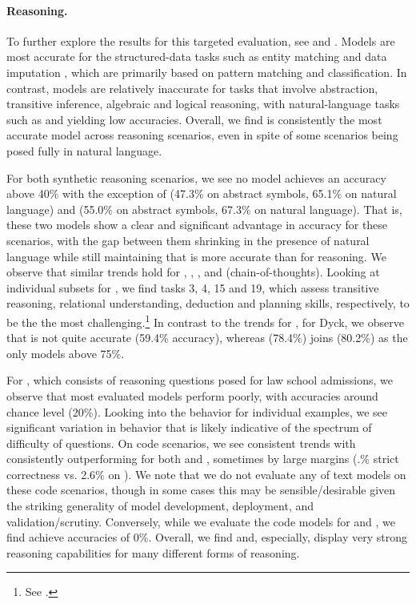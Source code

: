 \paragraph{Reasoning.}
To further explore the results for this targeted evaluation, see  and .
Models are most accurate for the structured-data tasks such as entity matching and data imputation \citep{narayan2022can}, which are primarily based on pattern matching and classification.
In contrast, models are relatively inaccurate for tasks that involve abstraction, transitive inference, algebraic and logical reasoning, with natural-language tasks such as \lsat \citep{zhong2021arlsat} and \gsm \citep{cobbe2020leveraging} yielding low accuracies.
Overall, we find \davincicodex is consistently the most accurate model across reasoning scenarios, even in spite of some scenarios being posed fully in natural language. 

For both synthetic reasoning scenarios, we see no model achieves an accuracy above 40\% with the exception of \instructdavinci (47.3\% on abstract symbols, 65.1\% on natural language) and \davincicodex (55.0\% on abstract symbols, 67.3\% on natural language). 
That is, these two models show a clear and significant advantage in accuracy for these scenarios, with the gap between them shrinking in the presence of natural language while still maintaining that \davincicodex is more accurate than \instructdavinci for reasoning. 
We observe that similar trends hold for \MATH, \gsm, \babi, and \MATH (chain-of-thoughts). 
Looking at individual subsets for \babi, we find tasks 3, 4, 15 and 19, which assess transitive reasoning, relational understanding, deduction and planning skills, respectively, to be the the most challenging.\footnote{See .}
In contrast to the trends for \instructdavinci, for Dyck, we observe that \instructdavinci is not quite accurate (59.4\% accuracy), whereas \mtnlgfivethreezero (78.4\%) joins \davincicodex (80.2\%) as the only models above 75\%. 

For \lsat \citep{zhong2021arlsat}, which consists of reasoning questions posed for law school admissions, we observe that most evaluated models perform poorly, with accuracies around chance level (20\%). 
Looking into the behavior for individual examples, we see significant variation in behavior that is likely indicative of the spectrum of difficulty of questions.
On code scenarios, we see consistent trends with \davincicodex consistently outperforming \cushmancodex for both \humaneval and \codeapps, sometimes by large margins (.\% strict correctness vs. 2.6\% on \codeapps). 
We note that we do not evaluate any of text models on these code scenarios, though in some cases this may be sensible/desirable given the striking generality of model development, deployment, and validation/scrutiny. 
Conversely, while we evaluate the code models for \lsat and \legalsupport, we find achieve accuracies of 0\%. 
Overall, we find \instructdavinci and, especially, \davincicodex display very strong reasoning capabilities for many different forms of reasoning. 

